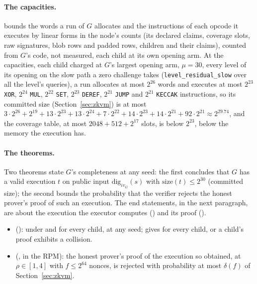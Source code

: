\documentclass[11pt]{article}
\begin{document}
\paragraph{The capacities.}  bounds the words a run of $G$ allocates and the instructions of each opcode it executes by linear forms in the node's counts (its declared claims, coverage slots, raw signatures, blob rows and padded rows, children and their claims), counted from $G$'s code, not measured, each child at its own opening arm. At the capacities, each child charged at $G$'s largest opening arm, $\mu = 30$, every level of its opening on the slow path a zero challenge takes (\texttt{level\_residual\_slow} over all the level's queries), a run allocates at most $2^{26}$ words and executes at most $2^{23}$ \texttt{XOR}, $2^{24}$ \texttt{MUL}, $2^{22}$ \texttt{SET}, $2^{23}$ \texttt{DEREF}, $2^{21}$ \texttt{JUMP} and $2^{21}$ \texttt{KECCAK} instructions, so its committed size (Section~\ref{sec:zkvm}) is at most $3 \cdot 2^{26} + 2^{19} + 13 \cdot 2^{23} + 13 \cdot 2^{24} + 7 \cdot 2^{22} + 14 \cdot 2^{23} + 14 \cdot 2^{21} + 92 \cdot 2^{21} \approx 2^{29.74}$, and the coverage table, at most $2048 + 512 + 2^{17}$ slots, is below $2^{23}$, below the memory the execution has.

\paragraph{The theorems.} Two  theorems state $G$'s completeness at any seed: the first concludes that $G$ has a valid execution $t$ on public input $\mathrm{dig}_{iv_G}(s)$ with $\mathrm{size}(t) \le 2^{30}$ (committed size); the second bounds the probability that the verifier rejects the honest prover's proof of such an execution. The end statements, in the next paragraph, are about the execution the executor computes () and its proof ().
\begin{itemize}
\item {} (): under  and  for every child, at any seed;  gives  for every child, or a child's proof exhibits a collision.
\item {} (, in the RPM): the honest prover's proof of the execution so obtained, at $\rho \in [1,4]$ with $f \le 2^{64}$ nonces, is rejected with probability at most $\delta(f)$ of Section~\ref{sec:zkvm}.
\end{itemize}
\end{document}
